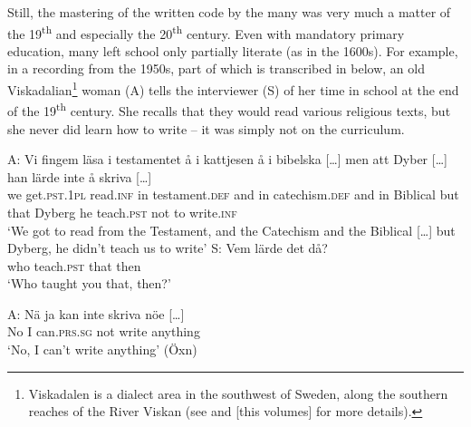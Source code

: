 \documentclass[output=paper]{langscibook}
\begin{document}
Still, the mastering of the written code by the many was very much a matter of the 19\textsuperscript{th} and especially the 20\textsuperscript{th} century. Even with mandatory primary education, many left school only partially literate (as in the 1600s). For example, in a recording from the 1950s, part of which is transcribed in  below, an old Viskadalian\footnote{Viskadalen is a dialect area in the southwest of Sweden, along the southern reaches of the River Viskan (see \citealt{Petzell2017,Petzell2018} and \citeyear{chapters/07} [this volumes] for more details).} woman (A) tells the interviewer (S) of her time in school at the end of the 19\textsuperscript{th} century. She recalls that they would read various religious texts, but she never did learn how to write – it was simply not on the curriculum.


\ea \label{ex:intro:4}
\ea
\gll A:    Vi   fingem         läsa       i     testamentet     å     i     kattjesen å     i     bibelska […] men att   Dyber […] han lärde inte   å   skriva […]\\
we   get.\textsc{pst.1pl}  read.\textsc{inf} in   testament.\textsc{def} and   in   catechism.\textsc{def} and   in   Biblical          but   that Dyberg       he   teach.\textsc{pst} not   to   write\textsc{.inf}\\
    \glt `We got to read from the Testament, and the Catechism and the Biblical […] but Dyberg, he didn’t teach us to write’
\ex
\gll S:     Vem   lärde       det   då?\\
      who    teach.\textsc{pst}  that  then\\
    \glt `Who taught you that, then?’

\gll A:   Nä   ja   kan           inte     skriva     nöe […]\\
  No  I  can\textsc{.prs.sg}   not  write   anything  \\
    \glt `No, I can’t write anything’ (Öxn)
\z
\z
\end{document}
